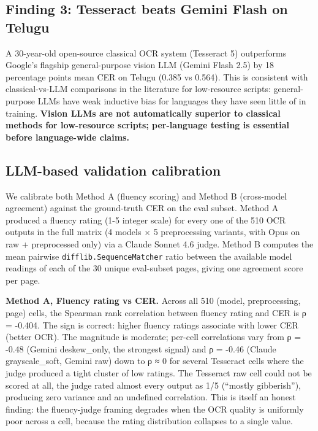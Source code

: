 \documentclass[
  letterpaper,
  DIV=11,
  numbers=noendperiod]{scrartcl}
\begin{document}
\subsection{Finding 3: Tesseract beats Gemini Flash on
Telugu}\label{finding-3-tesseract-beats-gemini-flash-on-telugu}

A 30-year-old open-source classical OCR system (Tesseract 5) outperforms
Google's flagship general-purpose vision LLM (Gemini Flash 2.5) by 18
percentage points mean CER on Telugu (0.385 vs 0.564). This is
consistent with classical-vs-LLM comparisons in the literature for
low-resource scripts: general-purpose LLMs have weak inductive bias for
languages they have seen little of in training. \textbf{Vision LLMs are
not automatically superior to classical methods for low-resource
scripts; per-language testing is essential before language-wide claims.}

\subsection{LLM-based validation
calibration}\label{llm-based-validation-calibration}

We calibrate both Method A (fluency scoring) and Method B (cross-model
agreement) against the ground-truth CER on the eval subset. Method A
produced a fluency rating (1-5 integer scale) for every one of the 510
OCR outputs in the full matrix (4 models × 5 preprocessing variants,
with Opus on raw + preprocessed only) via a Claude Sonnet 4.6 judge.
Method B computes the mean pairwise \texttt{difflib.SequenceMatcher}
ratio between the available model readings of each of the 30 unique
eval-subset pages, giving one agreement score per page.

\textbf{Method A, Fluency rating vs CER.} Across all 510 (model,
preprocessing, page) cells, the Spearman rank correlation between
fluency rating and CER is ρ = -0.404. The sign is correct: higher
fluency ratings associate with lower CER (better OCR). The magnitude is
moderate; per-cell correlations vary from ρ = -0.48 (Gemini
deskew\_only, the strongest signal) and ρ = -0.46 (Claude
grayscale\_soft, Gemini raw) down to ρ ≈ 0 for several Tesseract cells
where the judge produced a tight cluster of low ratings. The Tesseract
raw cell could not be scored at all, the judge rated almost every output
as 1/5 (``mostly gibberish''), producing zero variance and an undefined
correlation. This is itself an honest finding: the fluency-judge framing
degrades when the OCR quality is uniformly poor across a cell, because
the rating distribution collapses to a single value.
\end{document}
